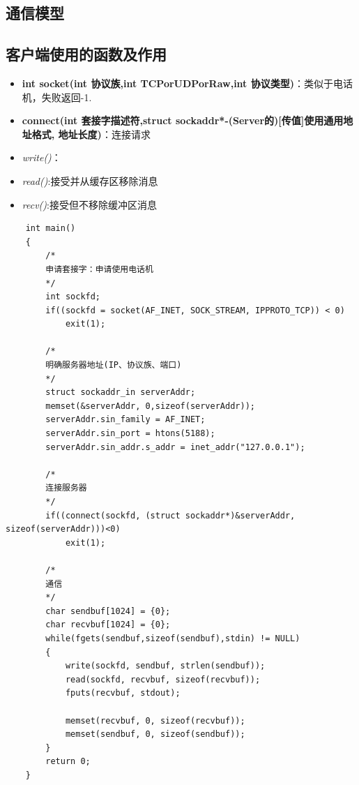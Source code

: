 \documentclass[UTF8,a4paper,12pt]{ctexbook}
\begin{document}
		\subsection{通信模型}
		
		\subsection{客户端使用的函数及作用}
			\begin{itemize}
				\item \textbf{int socket(int 协议族,int TCPorUDPorRaw,int 协议类型)}：类似于电话机，失败返回-1.
				\item \textbf{connect(int 套接字描述符,struct sockaddr*-(Server的)\textbf{[传值]}使用通用地址格式, 地址长度)}：连接请求
				\item \textit{write()}：
				\item \textit{read()}:接受并从缓存区移除消息
				\item \textit{recv()}:接受但不移除缓冲区消息
			\end{itemize}
			\begin{lstlisting}
	int main()
	{
		/*
		申请套接字：申请使用电话机
		*/
		int sockfd;
		if((sockfd = socket(AF_INET, SOCK_STREAM, IPPROTO_TCP)) < 0)
			exit(1);
		
		/*
		明确服务器地址(IP、协议族、端口)
		*/
		struct sockaddr_in serverAddr;
		memset(&serverAddr, 0,sizeof(serverAddr));
		serverAddr.sin_family = AF_INET;
		serverAddr.sin_port = htons(5188);
		serverAddr.sin_addr.s_addr = inet_addr("127.0.0.1");
		
		/*
		连接服务器
		*/
		if((connect(sockfd, (struct sockaddr*)&serverAddr, sizeof(serverAddr)))<0)
			exit(1);
		
		/*
		通信
		*/
		char sendbuf[1024] = {0};
		char recvbuf[1024] = {0};
		while(fgets(sendbuf,sizeof(sendbuf),stdin) != NULL)
		{
			write(sockfd, sendbuf, strlen(sendbuf));
			read(sockfd, recvbuf, sizeof(recvbuf));
			fputs(recvbuf, stdout);
			
			memset(recvbuf, 0, sizeof(recvbuf));
			memset(sendbuf, 0, sizeof(sendbuf));
		}
		return 0;
	}			
			\end{lstlisting}
\end{document}
